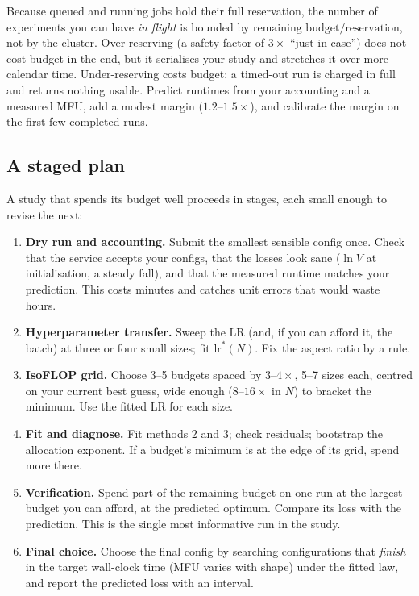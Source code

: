 \begin{systemslens}
Because queued and running jobs hold their full reservation, the number of experiments you can
have \emph{in flight} is bounded by $\text{remaining budget}/\text{reservation}$, not by the cluster.
Over-reserving (a safety factor of $3\times$ ``just in case'') does not cost budget in the end,
but it serialises your study and stretches it over more calendar time. Under-reserving costs
budget: a timed-out run is charged in full and returns nothing usable. Predict runtimes from
your accounting and a measured MFU, add a modest margin ($1.2$--$1.5\times$), and calibrate the
margin on the first few completed runs.
\end{systemslens}

\subsection{A staged plan}\label{sec:scalinglaws:stages}

A study that spends its budget well proceeds in stages, each small enough to revise the next:
\begin{enumerate}
\item \textbf{Dry run and accounting.} Submit the smallest sensible config once. Check that the
      service accepts your configs, that the losses look sane ($\ln V$ at initialisation, a
      steady fall), and that the measured runtime matches your prediction. This costs minutes
      and catches unit errors that would waste hours.
\item \textbf{Hyperparameter transfer.} Sweep the LR (and, if you can afford it, the batch) at
      three or four small sizes; fit $\text{lr}^*(N)$. Fix the aspect ratio by a rule.
\item \textbf{IsoFLOP grid.} Choose 3--5 budgets spaced by $3$--$4\times$, 5--7 sizes each,
      centred on your current best guess, wide enough ($8$--$16\times$ in $N$) to bracket the
      minimum. Use the fitted LR for each size.
\item \textbf{Fit and diagnose.} Fit methods 2 and 3; check residuals; bootstrap the allocation
      exponent. If a budget's minimum is at the edge of its grid, spend more there.
\item \textbf{Verification.} Spend part of the remaining budget on one run at the largest budget
      you can afford, at the predicted optimum. Compare its loss with the prediction. This is the
      single most informative run in the study.
\item \textbf{Final choice.} Choose the final config by searching configurations that
      \emph{finish} in the target wall-clock time (MFU varies with shape) under the fitted law,
      and report the predicted loss with an interval.
\end{enumerate}

